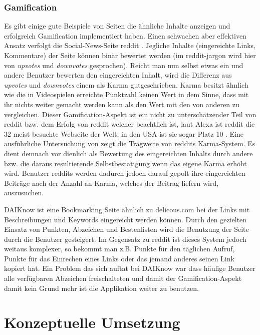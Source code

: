 \documentclass[12pt,twoside]{book}
\begin{document}
\subsection {Gamification}

Es gibt einige gute Beispiele von Seiten die ähnliche Inhalte anzeigen und erfolgreich Gamification implementiert haben. Einen schwachen aber effektiven Ansatz verfolgt die Social-News-Seite reddit \cite{reddit}. Jegliche Inhalte (eingereichte Links, Kommentare) der Seite können binär bewertet werden (im reddit-jargon wird hier von \textit{upvotes} und \textit{downvotes} gesprochen). Reicht man nun selbst etwas ein und andere Benutzer bewerten den eingereichten Inhalt, wird die Differenz aus \textit{upvotes} und \textit{downvotes} einem als Karma gutgeschrieben. Karma besitzt ähnlich wie die in Videospielen erreichte Punktzahl keinen Wert in dem Sinne, dass mit ihr nichts weiter gemacht werden kann als den Wert mit den von anderen zu vergleichen.
Dieser Gamification-Aspekt ist ein nicht zu unterschätzender Teil von reddit bzw. dem Erfolg von reddit welcher beachtlich ist, laut Alexa ist reddit die 32 meist besuchte Webseite der Welt, in den USA ist sie sogar Platz 10 \cite{alexa}.
Eine ausführliche Untersuchung von \citep{richerichkarma} zeigt die Tragweite von reddits Karma-System. Es dient demnach vor dienlich als Bewertung des eingereichten Inhalts durch andere bzw. die daraus resultierende Selbstbestätigung wenn das eigene Karma erhöht wird.
Benutzer reddits werden dadurch jedoch darauf gepolt ihre eingereichten Beiträge nach der Anzahl an Karma, welches der Beitrag liefern wird, auszusuchen.

DAIKnow \citep{meder2014daiknow} ist eine Bookmarking Seite ähnlich zu delicous.com\cite{delicious} bei der Links mit Beschreibungen und Keywords eingereicht werden können. Durch den gezielten Einsatz von Punkten, Abzeichen und Bestenlisten wird die Benutzung der Seite durch die Benutzer gesteigert. Im Gegensatz zu reddit ist dieses System jedoch weitaus komplexer, so bekommt man z.B. Punkte für den täglichen Aufruf, Punkte für das Einrechen eines Links oder das jemand anderes seinen Link kopiert hat.
Ein Problem das sich auftat bei DAIKnow war dass häufige Benutzer alle verfügbaren Abzeichen freischalteten und damit der Gamification-Aspekt damit kein Grund mehr ist die Applikation weiter zu benutzen.

\chapter{Konzeptuelle Umsetzung}\label{chap:concept}
\end{document}
